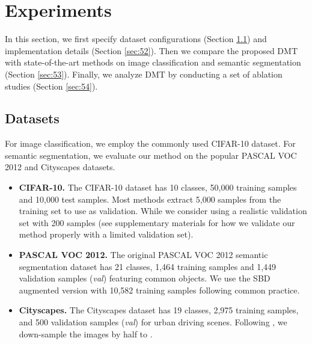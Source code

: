 \documentclass[preprint,review,10pt]{elsarticle}
\begin{document}
\section{Experiments}
\label{sec:5}

In this section, we first specify dataset configurations (Section \ref{sec:51}) and implementation details (Section \ref{sec:52}). Then we compare the proposed DMT with state-of-the-art methods on image classification and semantic segmentation (Section \ref{sec:53}). Finally, we analyze DMT by conducting a set of ablation studies (Section \ref{sec:54}).


\subsection{Datasets}
\label{sec:51}

For image classification, we employ the commonly used CIFAR-10 \cite{krizhevsky2009learning} dataset. For semantic segmentation, we evaluate our method on the popular PASCAL VOC 2012 \cite{everingham2015pascal} and Cityscapes \cite{cordts2016cityscapes} datasets.








\begin{itemize}
\item \textbf{CIFAR-10.} The CIFAR-10 \cite{krizhevsky2009learning} dataset has 10 classes, 50,000 training samples and 10,000 test samples. Most methods extract 5,000 samples from the training set to use as validation. While we consider using a realistic \cite{oliver2018realistic} validation set with 200 samples (see supplementary materials for how we validate our method properly with a limited validation set).

\item \textbf{PASCAL VOC 2012.} The original PASCAL VOC 2012 \cite{everingham2015pascal} semantic segmentation dataset has 21 classes, 1,464 training samples and 1,449 validation samples (\textit{val}) featuring common objects. We use the SBD \cite{hariharan2011semantic} augmented version with 10,582 training samples following common practice.

\item \textbf{Cityscapes.} The Cityscapes \cite{cordts2016cityscapes} dataset has 19 classes, 2,975 training samples, and 500 validation samples (\textit{val}) for urban driving scenes. Following \cite{mittal2019semi}, we down-sample the images by half to .
\end{itemize}
\end{document}
